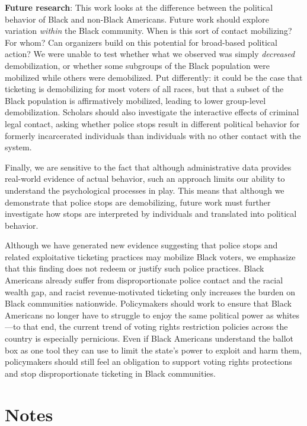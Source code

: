 \documentclass[
  12pt,
]{article}
\begin{document}
\textbf{Future research}: This work looks at the difference between the political behavior of Black and non-Black Americans. Future work should explore variation \emph{within} the Black community. When is this sort of contact mobilizing? For whom? Can organizers build on this potential for broad-based political action? We were unable to test whether what we observed was simply \emph{decreased} demobilization, or whether some subgroups of the Black population were mobilized while others were demobilized. Put differently: it could be the case that ticketing is demobilizing for most voters of all races, but that a subset of the Black population is affirmatively mobilized, leading to lower group-level demobilization. Scholars should also investigate the interactive effects of criminal legal contact, asking whether police stops result in different political behavior for formerly incarcerated individuals than individuals with no other contact with the system.

Finally, we are sensitive to the fact that although administrative data provides real-world evidence of actual behavior, such an approach limits our ability to understand the psychological processes in play. This means that although we demonstrate that police stops are demobilizing, future work must further investigate how stops are interpreted by individuals and translated into political behavior.

Although we have generated new evidence suggesting that police stops and related exploitative ticketing practices may mobilize Black voters, we emphasize that this finding does not redeem or justify such police practices. Black Americans already suffer from disproportionate police contact and the racial wealth gap, and racist revenue-motivated ticketing only increases the burden on Black communities nationwide. Policymakers should work to ensure that Black Americans no longer have to struggle to enjoy the same political power as whites---to that end, the current trend of voting rights restriction policies across the country is especially pernicious. Even if Black Americans understand the ballot box as one tool they can use to limit the state's power to exploit and harm them, policymakers should still feel an obligation to support voting rights protections and stop disproportionate ticketing in Black communities.

\newpage

\hypertarget{notes}{%
\section*{Notes}\label{notes}}
\end{document}
